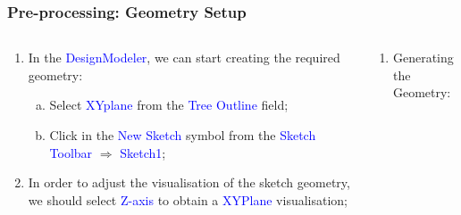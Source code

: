 \documentclass[10pt,compress]{beamer}
\newcommand{\blue}{\textcolor{blue}}
\begin{document}
\begin{frame}
 \frametitle{Pre-processing: Geometry Setup} 
    \begin{columns}
       \begin{column}[l]{0.5\linewidth}
          \begin{enumerate}[1)]\scriptsize\setcounter{enumi}{2}
             \item<1-> In the \blue{DesignModeler}, we can start creating the required geometry:
                 \begin{enumerate}[a)]\scriptsize
                    \item<1-> Select \blue{XYplane} from the \blue{Tree Outline} field;
                    \item<1-> Click in the \blue{New Sketch} symbol from the \blue{Sketch Toolbar} $\Rightarrow$ \blue{Sketch1};
                 \end{enumerate}
             \item<2-> In order to adjust the visualisation of the sketch geometry, we should select \blue{Z-axis} to obtain a \blue{XYPlane} visualisation;
          \end{enumerate}
          \begin{center}
          \end{center}
       \end{column}
       \begin{column}[l]{0.5\linewidth}
          \begin{enumerate}[1)]\scriptsize\setcounter{enumi}{4} 
             \item<3-> Generating the Geometry:
                 \begin{enumerate}[a)]\scriptsize

\end{enumerate}
\end{enumerate}
\end{column}
\end{columns}
\end{frame}
\end{document}
